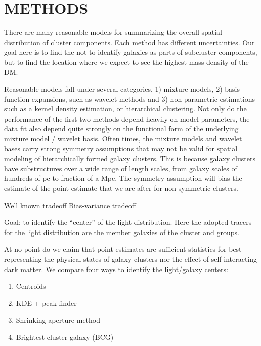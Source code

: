 \section{METHODS}\label{sec:methods}

There are many reasonable models for summarizing the overall spatial
distribution of cluster components. Each method has different uncertainties.
Our goal here is to find the  
not to identify galaxies as parts of subcluster components,
but to find the location where we expect to see the highest mass density of the
DM.

Reasonable models fall under several categories, 1) mixture models, 2) basis function
expansions, such as wavelet methods and 3) non-parametric estimations 
such as a kernel density estimation, or hierarchical clustering. 
Not only do the performance of the 
first two methods depend heavily on model parameters, 
the data fit also depend quite strongly on the functional form of 
the underlying mixture model / wavelet basis. Often times, 
the mixture models and wavelet bases 
carry strong symmetry assumptions that may not be valid for spatial modeling of 
hierarchically formed galaxy clusters. 
This is because galaxy clusters have substructures over a wide range of length
scales, from galaxy scales of hundreds of pc to fraction of a Mpc. 
The symmetry assumption will bias the estimate of the point estimate that we
are after for non-symmetric clusters.

Well known tradeoff Bias-variance tradeoff

Goal: to identify the ``center'' of the light distribution. Here the adopted 
tracers for the light distribution are the member galaxies of the cluster 
and groups.

At no point do we claim that point estimates are sufficient statistics for
best representing the physical states of galaxy clusters nor the effect of
self-interacting dark matter.
We compare four ways to identify the light/galaxy centers:
\begin{enumerate}
\item Centroids
\item KDE + peak finder
\item Shrinking aperture method
\item Brightest cluster galaxy (BCG)

\end{enumerate}

